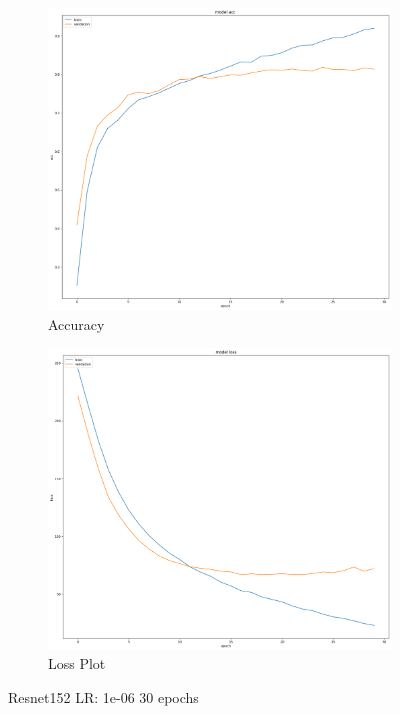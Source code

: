 \documentclass{article}[9pt]
\begin{document}
\begin{figure}[H]
  \begin{subfigure}{.5\textwidth}
    \includegraphics[width=\linewidth]{img/resnet152_Adam-1e-06-30ep16bs_1562750880-WEIGHTED-ACC.png}
    \caption{Accuracy}
    \label{adam_acc}
    \end{subfigure}
     \begin{subfigure}{.5\textwidth}
     \includegraphics[width=\linewidth]{img/resnet152_Adam-1e-06-30ep16bs_1562750880-WEIGHTED.png}
   \caption{Loss Plot}
    \label{adam_loss}
    \end{subfigure}
\caption{Resnet152 LR: 1e-06 30 epochs }

\end{figure}
\end{document}
